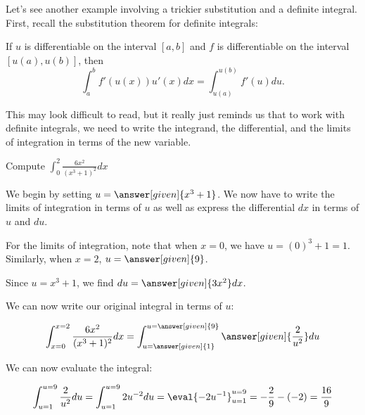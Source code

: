 \documentclass[nooutcomes]{ximera}
\begin{document}
Let's see another example involving a trickier substitution and a definite integral.  First, recall the substitution theorem for definite integrals:

\begin{theorem} 
If $u$ is differentiable on the interval $[a,b]$ and $f$ is
differentiable on the interval $[u(a),u(b)]$, then
\[
\int_a^b f'(u(x)) u'(x) dx =\int_{u(a)}^{u(b)} f'(u) du.
\]
\end{theorem}

This may look difficult to read, but it really just reminds us that to work with definite integrals, we need to write the integrand, the differential, and the limits of integration in terms of the new variable.  

\begin{example}
Compute $\int_0^2 \frac{6x^2}{(x^3+1)^2} dx$

\begin{explanation}
We begin by setting $u = \answer[given]{x^3+1}$.  We now have to write the limits of integration in terms of $u$ as well as express the differential $dx$ in terms of $u$ and $du$.

For the limits of integration, note that when $x=0$, we have $u = (0)^3+1 = 1$.  Similarly, when $x=2$, $u=\answer[given]{9}$.

Since $u=x^3+1$, we find $du = \answer[given]{3x^2} dx$.

We can now write our original integral in terms of $u$:

\[
\int_{x=0}^{x=2} \frac{6x^2}{(x^3+1)^2} dx = \int_{u=\answer[given]{1}}^{u=\answer[given]{9}} \answer[given]{\frac{2}{u^2}} du
\]

We can now evaluate the integral:

\[
\int_{u=1}^{u=9} \frac{2}{u^2} du = \int_{u=1}^{u=9}2u^{-2} du = \eval{-2u^{-1}}_{u=1}^{u=9} = -\frac{2}{9} - (-2) = \frac{16}{9}
\]
\end{explanation}
\end{example}
\end{document}
